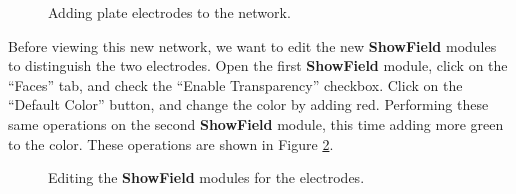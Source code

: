\documentclass[fleqn,11pt,openany]{book}
\begin{document}
\begin{figure}
\caption{Adding plate electrodes to the network.}\label{fig:network_2}
\end{figure}

Before viewing this new network, we want to edit the new {\bf
ShowField} modules to distinguish the two electrodes. Open the first
{\bf ShowField} module, click on the ``Faces'' tab, and check the
``Enable Transparency'' checkbox. Click on the ``Default Color''
button, and change the color by adding red. Performing these same
operations on the second {\bf ShowField} module, this time adding more
green to the color. These operations are shown in Figure
\ref{fig:network_2_show_field}.

\begin{figure}
\caption{Editing the {\bf ShowField} modules for the
electrodes.}\label{fig:network_2_show_field}
\end{figure}
\end{document}
